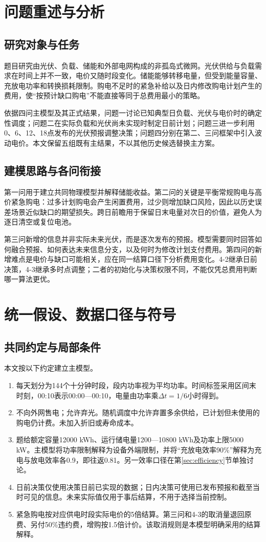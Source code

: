\section{问题重述与分析}
\subsection{研究对象与任务}
题目研究由光伏、负载、储能和外部电网构成的非孤岛式微网\cite{problem}。光伏供给与负载需求在时间上并不一致，电价又随时段变化。储能能够转移电量，但受到能量容量、充放电功率和转换损耗限制。购电不足时的紧急补给以及日内修改购电计划产生的费用，使“按预计缺口购电”不能直接等同于总费用最小的策略。

依据四问主模型及其正式结果\cite{models}，问题一讨论已知典型日负载、光伏与电价时的确定性调度；问题二在实际负载和光伏尚未实现时制定日前计划；问题三进一步利用0、6、12、18点发布的光伏预报调整决策；问题四分别在第二、三问框架中引入波动电价。本文保留五组既有主结果，不以其他历史候选替换主方案。

\subsection{建模思路与各问衔接}
第一问用于建立共同物理模型并解释储能收益。第二问的关键是平衡常规购电与高价紧急购电：过多计划购电会产生闲置费用，过少则增加缺口风险，因此以历史误差场景近似缺口的期望损失。跨日前瞻用于保留日末电量对次日的价值，避免人为逐日清空或复位电池。

第三问新增的信息并非实际未来光伏，而是逐次发布的预报。模型需要同时回答如何融合预报、如何表达未来信息分支，以及何时为修改计划支付费用。第四问的新增难点是电价与缺口可能相关，应在同一结算口径下分析费用变化。4-2继承日前决策，4-3继承多时点调整；二者的初始化与决策权限不同，不能仅凭总费用判断哪一算法更优。

\section{统一假设、数据口径与符号}
\subsection{共同约定与局部条件}
本文按以下约定建立主模型。
\begin{enumerate}
\item 每天划分为144个十分钟时段，段内功率视为平均功率。时间标签采用区间末时刻，00:10表示00:00—00:10，电量由功率乘$\Delta t=1/6$小时得到。
\item 不向外网售电；允许弃光。随机调度中允许弃置多余供给，已计划但未使用的购电仍计费。未加入折旧或寿命成本。
\item 题给额定容量12000 kWh、运行储电量1200—10800 kWh及功率上限5000 kW。主模型将功率限制解释为设备外端限制，并将“充放电效率90\%”解释为充电与放电效率各0.9，即往返0.81。另一效率口径在第\ref{sec:efficiency}节单独讨论。
\item 日前决策仅使用决策日前已实现的数据；日内决策可使用已发布预报和截至当时可见的信息。未来实际值仅用于事后结算，不用于选择当前控制。
\item 紧急购电按对应供电时段实际电价的5倍结算。第三问和4-3的取消量退回原费、另付50\%违约费，增购按1.5倍计价。该取消规则是本模型明确采用的结算解释。
\end{enumerate}

